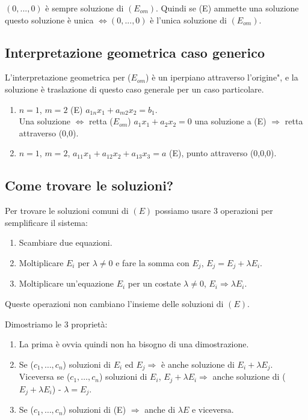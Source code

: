 \begin{observation}
$(0,...,0)$ è sempre soluzione di $(E_{om})$. Quindi se (E) ammette una soluzione questo soluzione è unica $\Longleftrightarrow (0,...,0)$ è l'unica soluzione di $(E_{om})$.
\end{observation}

\subsection{Interpretazione geometrica caso generico}
L'interpretazione geometrica per ($E_{om}$) è un iperpiano attraverso l'origine", e la soluzione è traslazione di questo caso generale per un caso particolare.
\begin{enumerate}
    \item $n=1$, $m=2$ (E) $a_{1n}x_1 + a_{m2}x_2 = b_1$.\\
    Una soluzione $\Longleftrightarrow$ retta ($E_{om}$) $a_1x_1 + a_2x_2 = 0$ una soluzione a (E) $\Rightarrow$ retta attraverso (0,0).
    \item $n=1$, $m=2$, $a_{11}x_1 + a_{12}x_2 + a_{13}x_3 = a$ (E), punto attraverso (0,0,0).
\end{enumerate}

\subsection{Come trovare le soluzioni?}
Per trovare le soluzioni comuni di $(E)$ possiamo usare 3 operazioni per semplificare il sistema:
\begin{enumerate}
    \item Scambiare due equazioni.
    \item Moltiplicare $E_i$ per $\lambda \neq 0$ e fare la somma con $E_j$, $E_j = E_j + \lambda E_i$.
    \item Moltiplicare un'equazione $E_i$ per un costate $\lambda \neq 0$, $E_i \Rightarrow \lambda E_i$.
\end{enumerate}

\begin{observation}
Queste operazioni non cambiano l'insieme delle soluzioni di $(E)$.
\end{observation}

\begin{demostration}
Dimostriamo le 3 proprietà:
\begin{enumerate}
    \item La prima è ovvia quindi non ha bisogno di una dimostrazione.
    \item Se ($c_1, \ldots, c_n$) soluzioni di $E_i$ ed $E_j \Rightarrow$ è anche soluzione di $E_i + \lambda E_j$.\\
    Viceversa se ($c_1, \ldots, c_n$) soluzioni di $E_i$, $E_j + \lambda E_i \Rightarrow$ anche soluzione di ($E_j + \lambda E_i$) - $\lambda = E_j$.
    \item Se ($c_1, \ldots, c_n$) soluzioni di (E) $\Rightarrow$ anche di $\lambda E$ e viceversa.
\end{enumerate}
\end{demostration}

